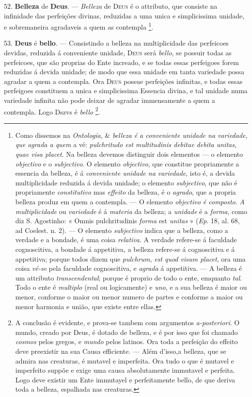 52. \textbf{Belleza} de \textbf{Deus}. --- \emph{Belleza} de \textsc{Deus} é o attributo, que consiste na infinidade das perfeições divinas, reduzidas a uma unica e simplicissima unidade, e sobremaneira agradaveis a quem as contempla \footnote{Como dissemos na \emph{Ontologia}, \& \emph{belleza é a conveniente unidade na variedade}, \emph{que agrada a quem} a vé: \emph{pulchritudo est multitudinis debitae debita unitas}, \emph{quae visa placet}. Na belleza devemos distinguir dois elementos --- o elemento \emph{objectivo} e o \emph{subjectivo}. O elemento \emph{objectivo}, que constitue propriamente a essencia da belleza, é á \emph{conveniente unidade na variedade}, isto é, a devida multiplicidade reduzida á devida unidade; o elemento \emph{subjectivo}, que não é propriamente \emph{constitutivo} mas \emph{effeito} da belleza, é o \emph{agrado}, que a propria belleza produz em quem a contempla. --- O elemento \emph{objectivo é composto}. \emph{A multiplicidade} ou \emph{variedade} é á \emph{materia} da belleza; a \emph{unidade} é a \emph{forma}, como diz S. Agostinho: « Omnis pulchritudinis \emph{forma} est \emph{unitas} » (\emph{Ep}. 18, al. 68, ad Coelest. n. 2). --- O elemento \emph{subjectivo} indica que a belleza, como a verdade e a bondade, é uma coisa \emph{relativa}. A verdade refere-se á faculdade cognoscitiva, a bondade á appetitiva, a belleza refere-se á cognoscitiva e á appetitiva; porque todos dizem que \emph{pulchrum}, \emph{est quod visum placet}, ora uma coisa \emph{vé-se} pela faculdade cognoscitiva, e \emph{agrada} á appetitiva. --- A belleza é um attributo \emph{transcendental}; porque é proprio de todo o ente, emquanto \emph{tal}. Todo o ente é \emph{multiplo} (real ou logicamente) e \emph{uno}, e a sua belleza é maior ou menor, conforme o maior ou menor numero de partes e conforme a maior ou menor harmonia e união, que existe entre ellas.}.

53. \textbf{Deus} é \textbf{bello}. --- Consistindo a belleza na multiplicidade das perfeicoes devidas, reduzida á conveniente unidade, \textsc{Deus} será \emph{bello}, se possuir todas as perfeicoes, que são proprias do Ente increado, e se todas essas perfeigoes forem reduzidas á devida unidade; de modo que essa unidade em tanta variedade possa agradar a quem a contempla. Ora \textsc{Deus} possue perfeições infinitas, e todas essas perfeigoes constituem a unica e simplicissima Essencia divina, e tal unidade numa variedade infinita não pode deixar de agradar immensamente a quem a contempla. Logo Dszvs é \emph{bello} \footnote{A conclusão é evidente, e prova-se tambem com argumentos \emph{a-posteriori}. O mundo, creado por Deus, é dotado de belleza, e é por isso que foi chamado \emph{cosmos} pelos gregos, e \emph{mundo} pelos latinos. Ora toda a perfeição do effeito deve preexistir na sua Causa efficiente. --- Além d'isso,a belleza, que se admira nas creaturas, é mutavel e imperfeita. Ora tudo o que é mutavel e imperfeito suppõe e exige uma causa absolutamente immutavel e perfeita. Logo deve existir um Ente immutayel e perfeitamente bello, de que deriva toda a belleza, espalhada nas creaturas.}.

